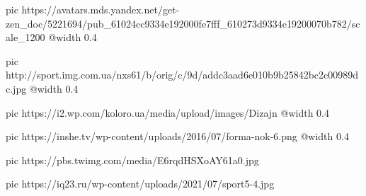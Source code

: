  
 
 
 
 

\ifcmt
	pic https://avatars.mds.yandex.net/get-zen_doc/5221694/pub_61024cc9334e192000fe7fff_610273d9334e19200070b782/scale_1200
	@width 0.4

	pic http://sport.img.com.ua/nxs61/b/orig/c/9d/addc3aad6e010b9b25842bc2c00989dc.jpg
	@width 0.4

	pic https://i2.wp.com/koloro.ua/media/upload/images/Dizajn%
	@width 0.4

	pic https://inshe.tv/wp-content/uploads/2016/07/forma-nok-6.png
	@width 0.4

	pic https://pbs.twimg.com/media/E6rqdHSXoAY61a0.jpg

	pic https://iq23.ru/wp-content/uploads/2021/07/sport5-4.jpg
\fi
